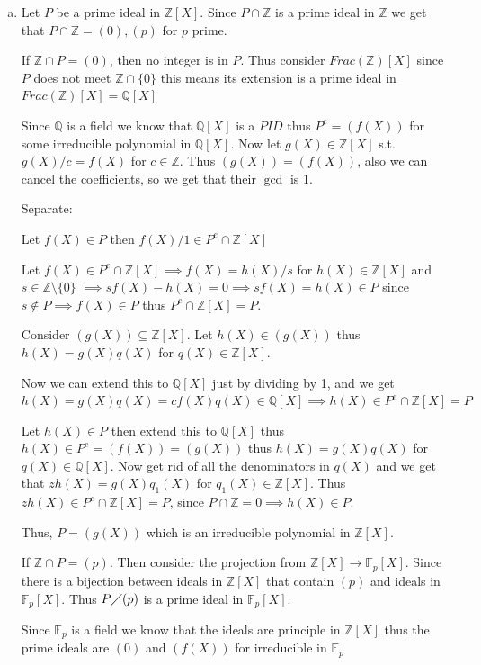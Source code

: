 \documentclass[12pt, letterpaper]{article}
\newcommand{\Q}{\mathbb{Q}}
\newcommand{\Z}{\mathbb{Z}}
\newcommand{\F}{\mathbb{F}}
\begin{document}
\begin{enumerate}[(a)]
\begin{enumerate}[1.]
    \item $(2,3,5 \in S)$ This gives us that everything in our set has an inverse, so for example $2*30=0 \implies 1=0$ since $2,30$ have an inverse. Thus, we have the zero ring in this case.
   \end{enumerate}

    \item Let $P$ be a prime ideal in $\Z[X]$. Since $P \cap \Z$ is a prime ideal in $\Z$ we get that $P \cap \Z =(0),(p)$ for $p$ prime.
    
    If $\Z \cap P = (0)$, then no integer is in $P$. Thus consider $Frac(\Z)[X]$ since $P$ does not meet $\Z \cap \{0\}$ this means its extension is a prime ideal in $Frac(\Z)[X]=\Q[X]$

    Since $\Q$ is a field we know that $\Q[X]$ is a $PID$ thus $P^e=(f(X))$ for some irreducible polynomial in $\Q[X]$. Now let $g(X) \in \Z[X]$ s.t. $g(X)/c = f(X)$ for $c \in \Z$. Thus $(g(X))=(f(X))$, also we can cancel the coefficients, so we get that their $\gcd$ is 1.

    Separate: 

    Let $f(X) \in P$ then $f(X)/1 \in P^e \cap \Z[X]$

    Let $f(X) \in P^e \cap \Z[X] \implies f(X)=h(X)/s$ for $h(X) \in \Z[X]$ and $s \in \Z \setminus \{0\}$ $\implies sf(X)-h(X)=0 \implies sf(X)=h(X) \in P$ since $s \notin P \implies f(X) \in P$ thus $P^e \cap \Z[X]=P$.

    Consider $(g(X)) \subseteq \Z[X]$. Let $h(X) \in (g(X))$ thus $h(X)=g(X)q(X)$ for $q(X) \in \Z[X]$.

    Now we can extend this to $\Q[X]$ just by dividing by 1, and we get $h(X)=g(X)q(X)=cf(X)q(X) \in \Q[X] \implies h(X) \in P^e \cap \Z[X]=P$

    Let $h(X) \in P$ then extend this to $\Q[X]$ thus $h(X) \in P^e=(f(X))=(g(X))$ thus $h(X)=g(X)q(X)$ for $q(X) \in \Q[X]$. Now get rid of all the denominators in $q(X)$ and we get that $zh(X)=g(X)q_1(X)$ for $q_1(X) \in \Z[X]$. Thus $zh(X) \in P^e \cap \Z[X]=P$, since $P \cap \Z =0 \implies h(X) \in P$.

    Thus, $P=(g(X))$ which is an irreducible polynomial in $\Z[X]$.

    If $\Z \cap P = (p)$. Then consider the projection from $\Z[X] \to \F_p[X]$. Since there is a bijection between ideals in $\Z[X]$ that contain $(p)$ and ideals in $\F_p[X]$. Thus $P \diagup (p)$ is a prime ideal in $\F_p[X]$.

    Since $\F_p$ is a field we know that the ideals are principle in $\Z[X]$ thus the prime ideals are $(0)$ and $(f(X))$ for irreducible in $\F_p$


\end{enumerate}
\end{document}

